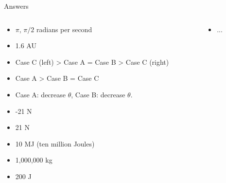 \documentclass{beamer}
\begin{document}
\begin{frame}{Answers}
\begin{columns}[T]
\begin{column}{0.5\textwidth}
\begin{itemize}
\item $\pi$, $\pi/2$ radians per second
\item 1.6 AU
\item Case C (left) > Case A = Case B > Case C (right)
\item Case A > Case B = Case C
\item Case A: decrease $\theta$, Case B: decrease $\theta$.
\item -21 N
\item 21 N
\item 10 MJ (ten million Joules)
\item 1,000,000 kg
\item 200 J
\end{itemize}
\end{column}
\begin{column}{0.5\textwidth}
\begin{itemize}
\item ... 
\end{itemize}
\end{column}
\end{columns}
\end{frame}
\end{document}
